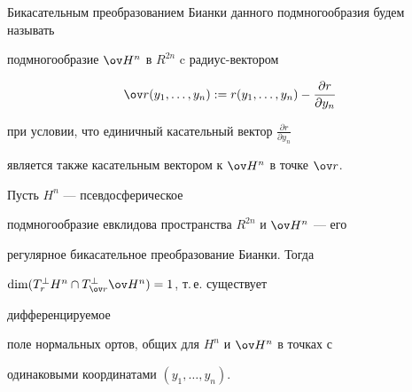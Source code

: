 Бикасательным преобразованием Бианки данного подмногообразия будем называть 


подмногообразие $\ov H{}^n$ в $R^{2n}$ c радиус-вектором 


$$


\ov r(y_1,\dotsc,y_n):=r(y_1,\dotsc,y_n)- \frac{\partial r}{\partial y_n}


$$


при условии, что единичный касательный вектор $\frac{\partial r}{\partial y_n}$


является также касательным вектором к $\ov H{}^n$ в точке $\ov r$.





\begin{propnonum}


Пусть $H^n$ --- псевдосферическое 


подмногообразие евклидова пространства $R^{2n}$ и $\ov H{}^n$ --- его 


регулярное бикасательное преобразование Бианки. Тогда 


$\dim(T^{\perp}_rH^n \cap T^{\perp}_{\ov r}\ov H{}^n)= 1$, т.\,е. существует 


дифференцируемое 


поле нормальных ортов, общих для $H^n$ и $\ov H{}^n$ в точках с 


одинаковыми координатами $(y_1,\dotsc,y_n)$.


\end{propnonum}





